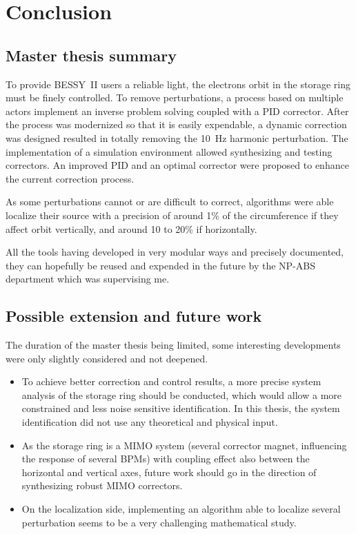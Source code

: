 
\chapter{Conclusion}

\section{Master thesis summary}
To provide BESSY~II users a reliable light, the electrons orbit in the storage ring must be finely controlled. To remove perturbations, a process based on multiple actors implement an inverse problem solving coupled with a PID corrector. After the process was modernized so that it is easily expendable, a dynamic correction was designed resulted in totally removing the \SI{10}{\hertz} harmonic perturbation. The implementation of a simulation environment allowed synthesizing and testing correctors. An improved PID and an optimal corrector were proposed to enhance the current correction process.

As some perturbations cannot or are difficult to correct, algorithms were able localize their source with a precision of around 1\% of the circumference if they affect orbit vertically, and around 10 to 20\% if horizontally.

All the tools having developed in very modular ways and precisely documented, they can hopefully be reused and expended in the future by the NP-ABS department which was supervising me.

\section{Possible extension and future work}

The duration of the master thesis being limited, some interesting developments were only slightly considered and not deepened.

\begin{itemize}
    \item To achieve better correction and control results, a more precise system analysis of the storage ring should be conducted, which would allow a more constrained and less noise sensitive identification.  In this thesis, the system identification did not use any theoretical and physical input.
    \item As the storage ring is a MIMO system (several corrector magnet, influencing the response of several BPMs) with coupling effect also between the horizontal and vertical axes, future work should go in the direction of synthesizing robust MIMO correctors.
    \item On the localization side, implementing an algorithm able to localize several perturbation seems to be a very challenging mathematical study.
\end{itemize}